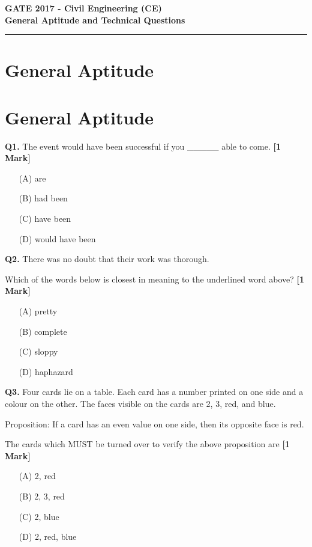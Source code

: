 \documentclass[11pt]{article}
\newcommand{\questiona}[2]{
    \noindent\textbf{Q#2.} #1 \hfill \textbf{[1 Mark]}
}
\begin{document}
\begin{center}
    \Large\textbf{GATE 2017 - Civil Engineering (CE)} \\
    \large\textbf{General Aptitude and Technical Questions} \\
    \rule{\textwidth}{0.5pt} %
\end{center}

\vspace{0.5cm}

\section*{General Aptitude}

\section*{General Aptitude}

\questiona{The event would have been successful if you \_\_\_\_\_ able to come.}{1}
\begin{enumerate}
    \item[(A)] are  
    \item[(B)] had been  
    \item[(C)] have been  
    \item[(D)] would have been  
\end{enumerate}

\vspace{0.5cm}

\questiona{There was no doubt that their work was thorough.

Which of the words below is closest in meaning to the underlined word above?}{2}
\begin{enumerate}
    \item[(A)] pretty  
    \item[(B)] complete  
    \item[(C)] sloppy  
    \item[(D)] haphazard  
\end{enumerate}

\vspace{0.5cm}

\questiona{Four cards lie on a table. Each card has a number printed on one side and a colour on the other. The faces visible on the cards are 2, 3, red, and blue.

Proposition: If a card has an even value on one side, then its opposite face is red.

The cards which MUST be turned over to verify the above proposition are}{3}
\begin{enumerate}
    \item[(A)] 2, red  
    \item[(B)] 2, 3, red  
    \item[(C)] 2, blue  
    \item[(D)] 2, red, blue  
\end{enumerate}
\end{document}
